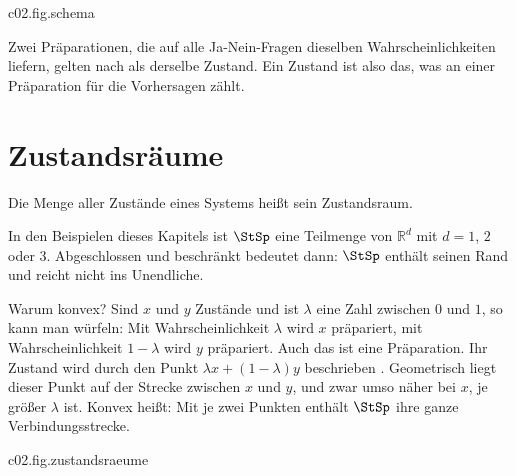 \begin{tpcfigure}{c02.fig.schema}
  \caption{Ein Durchlauf eines Experiments. Die Präparation versetzt das System in einen
    Zustand $x$; danach wird eine Ja-Nein-Frage gestellt. Die Theorie sagt die
    Wahrscheinlichkeit $f(x)$ der Antwort Ja voraus. Im ganzen Kapitel sind Zustände
    durchgezogen und als gefüllte Punkte gezeichnet, Effekte gestrichelt und als Quadrate.}
\end{tpcfigure}

Zwei Präparationen, die auf alle Ja-Nein-Fragen dieselben Wahrscheinlichkeiten liefern,
gelten nach  als derselbe Zustand. Ein Zustand ist also das, was an einer
Präparation für die Vorhersagen zählt.

\section{Zustandsräume}\label{c02.s2}

Die Menge aller Zustände eines Systems heißt sein Zustandsraum.


In den Beispielen dieses Kapitels ist $\StSp$ eine Teilmenge von $\mathbb{R}^d$ mit
$d = 1$, $2$ oder $3$. Abgeschlossen und beschränkt bedeutet dann: $\StSp$ enthält seinen
Rand und reicht nicht ins Unendliche.

Warum konvex? Sind $x$ und $y$ Zustände und ist $\lambda$ eine Zahl zwischen $0$ und $1$,
so kann man würfeln: Mit Wahrscheinlichkeit $\lambda$ wird $x$ präpariert, mit
Wahrscheinlichkeit $1-\lambda$ wird $y$ präpariert. Auch das ist eine Präparation. Ihr
Zustand wird durch den Punkt $\lambda x + (1-\lambda) y$ beschrieben
.
Geometrisch liegt dieser Punkt auf der Strecke zwischen $x$ und $y$, und zwar umso näher bei
$x$, je größer $\lambda$ ist. Konvex heißt: Mit je zwei Punkten enthält $\StSp$ ihre ganze
Verbindungsstrecke.


\begin{tpcfigure}{c02.fig.zustandsraeume}
  \caption{Die drei Zustandsräume dieses Kapitels: (a) eine Strecke, (b) ein Quadrat,
    (c) eine Kugel, hier mit ihrem Äquator gezeichnet. In jedem ist die Mischung
    $z = \tfrac14 x + \tfrac34 y$ zweier Zustände $x$ und $y$ eingetragen (offener Kreis);
    sie liegt auf der Verbindungsstrecke, dreimal so nah bei $y$ wie bei $x$. Die reinen
    Zustände sind in (a) die beiden Endpunkte $s_0$, $s_1$, in (b) die vier Ecken
    $s_{00}$, $s_{10}$, $s_{01}$, $s_{11}$ und in (c) alle Punkte der Kugeloberfläche.
    Das wird in Abschnitt~\ref{c02.s4} nachgerechnet.}
\end{tpcfigure}

